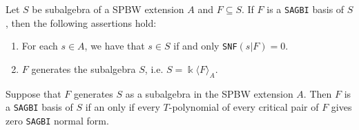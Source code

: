 \documentclass[10pt,a4paper]{amsart}
\begin{document}
\begin{proposition}\label{prop}
Let $S$ be subalgebra of a SPBW extension $A$ and $F \subseteq S$. If $F$ is a {\rm \texttt{SAGBI}} basis of $S$, then the following assertions hold:
\begin{enumerate}
\item[\rm{(1)}] \label{1} For each  $s\in A$, we have that $s \in S$ if and only {\rm \texttt{SNF}}$(s | F) = 0$.

\item[\rm{(2)}]  $F$ generates the subalgebra $S$, i.e. $S=\Bbbk\langle F\rangle_{A}$.
\end{enumerate}
\end{proposition}

\begin{theorem}\label{sagbicriterio} 
Suppose that $F$ generates $S$ as a subalgebra in the SPBW extension $A.$ Then $F$ is a {\rm {\texttt{SAGBI}}} basis of $S$ if an only if every $T$-polynomial of every critical pair of $F$ gives zero {\rm {\texttt{SAGBI}}} normal form.
\end{theorem}
\end{document}
